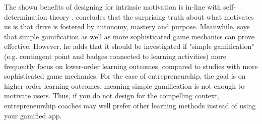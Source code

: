 The shown benefits of designing for intrinsic motivation is in-line with self-determination theory \citep{deci, ryan}.  \cite{pink} concludes that the surprising truth about what motivates us is that drive is fostered by autonomy, mastery and purpose. Meanwhile, \cite{gates} says that simple gamification as well as more sophisticated game mechanics can prove effective. However, he adds that it should be investigated if "simple gamification" (e.g. contingent point and badges connected to learning activities) more frequently focus on lower-order learning outcomes, compared to studies with more sophisticated game mechanics. For the case of entrepreneurship, the goal is on higher-order learning outcomes, meaning simple gamification is not enough to motivate users. Thus, if you do not design for the compelling context, entrepreneurship coaches may well prefer other learning methods instead of using your gamified app.
